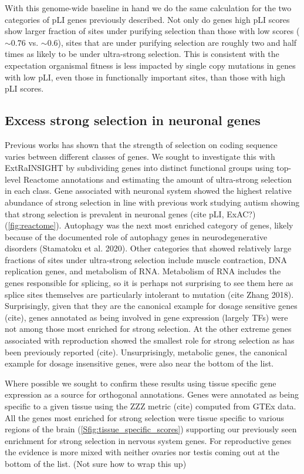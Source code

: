 \documentclass[11pt]{article}
\begin{document}
With this genome-wide baseline in hand we do the same calculation for the two categories of pLI genes previously described. Not only do genes high pLI scores show larger fraction of sites under purifying selection than those with low scores ($\sim 0.76$ vs. $\sim 0.6$), sites that are under purifying selection are roughly two and half times as likely to be under ultra-strong selection. This is consistent with the expectation organismal fitness is less impacted by single copy mutations in genes with low pLI, even those in functionally important sites, than those with high pLI scores.

\subsection*{Excess strong selection in neuronal genes}

Previous works has shown that the strength of selection on coding sequence varies between different classes of genes. We sought to investigate this with ExtRaINSIGHT by subdividing genes into distinct functional groups using top-level Reactome annotations and estimating the amount of ultra-strong selection in each class. Gene associated with neuronal system showed the highest relative abundance of strong selection in line with previous work studying autism showing that strong selection is prevalent in neuronal genes (cite pLI, ExAC?)(\ref{fig:reactome}). Autophagy was the next most enriched category of genes, likely because of the documented role of autophagy genes in neurodegenerative disorders (Stamatoku et al. 2020). Other categories that showed relatively large fractions of sites under ultra-strong selection include muscle contraction, DNA replication genes, and metabolism of RNA. Metabolism of RNA includes the genes responsible for splicing, so it is perhaps not surprising to see them here as splice sites themselves are particularly intolerant to mutation (cite Zhang 2018). Surprisingly, given that they are the canonical example for dosage sensitive genes (cite), genes annotated as being involved in gene expression (largely TFs) were not among those most enriched for strong selection. At the other extreme genes associated with reproduction showed the smallest role for strong selection as has been previously reported (cite). Unsurprisingly, metabolic genes, the canonical example for dosage insensitive genes, were also near the bottom of the list.

Where possible we sought to confirm these results using tissue specific gene expression as a source for orthogonal annotations. Genes were annotated as being specific to a given tissue using the ZZZ metric (cite) computed from GTEx data. All the genes most enriched for strong selection were tissue specific to various regions of the brain (\ref{Sfig:tissue_specific_scores}) supporting our previously seen enrichment for strong selection in nervous system genes. For reproductive genes the evidence is more mixed with neither ovaries nor testis coming out at the bottom of the list. (Not sure how to wrap this up)
\end{document}
